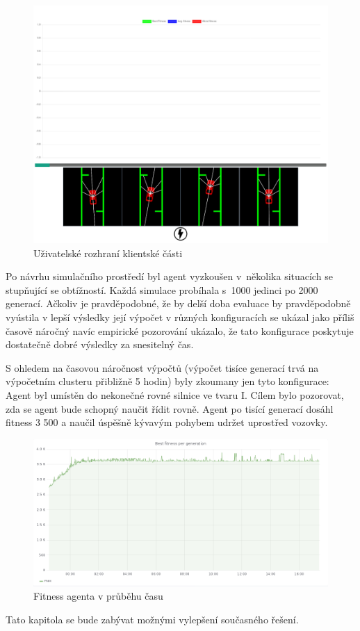 \begin{figure}[h!]
	\centering
	\includegraphics[width=0.6\linewidth]{visualization}
	\caption{Uživatelské rozhraní klientské části}
	\label{fig:visualization}
\end{figure}


Po návrhu simulačního prostředí byl agent vyzkoušen v~několika situacích se stupňující se obtížností. Každá simulace probíhala s~1000 jedinci po 2000 generací. Ačkoliv je pravděpodobné, že by delší doba evaluace by pravděpodobně vyústila v lepší výsledky její výpočet v různých konfiguracích se ukázal jako příliš časově náročný navíc empirické pozorování ukázalo, že tato konfigurace poskytuje dostatečně dobré výsledky za snesitelný čas. 

S ohledem na časovou náročnost výpočtů (výpočet tisíce generací trvá na výpočetním clusteru přibližně 5 hodin) byly zkoumany jen tyto konfigurace:
Agent byl umístěn do nekonečné rovné silnice ve tvaru I. Cílem bylo pozorovat, zda se agent bude schopný naučit řídit rovně. Agent po tisící generací dosáhl fitness 3 500 a naučil úspěšně kývavým pohybem udržet uprostřed vozovky.
\begin{figure}[h]
	\centering
	\includegraphics[scale=0.4]{I_fitness}
	\caption{Fitness agenta v průběhu času}
	\label{fig:i-experiment}
\end{figure}

Tato kapitola se bude zabývat možnými vylepšení současného řešení.
